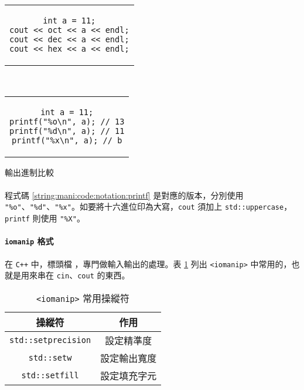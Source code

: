 \documentclass[12pt,a4paper,oneside]{article}
\begin{document}
\begin{CJK}{UTF8}{bkai}
\begin{code}[h!]
  \centering
  \begin{subcode}{.43\textwidth}
    \centering
    \begin{tabular}{c}
    \begin{lstlisting}
int a = 11;
cout << oct << a << endl;
cout << dec << a << endl;
cout << hex << a << endl;
    \end{lstlisting}
    \end{tabular}
    \caption{\lstinline!cout! 版本}
    \label{string:mani:code:notation:cout}
  \end{subcode}
  ~
  \begin{subcode}{.43\textwidth}
    \centering
    \begin{tabular}{c}
    \begin{lstlisting}
int a = 11;
printf("%o\n", a); // 13
printf("%d\n", a); // 11
printf("%x\n", a); // b
    \end{lstlisting}
    \end{tabular}
    \caption{\lstinline!printf! 版本}
    \label{string:mani:code:notation:printf}
  \end{subcode}
  \caption{輸出進制比較}
  \label{string:mani:code:notation}
\end{code}

\paragraph{}程式碼 \ref{string:mani:code:notation:printf} 是對應的版本，分別使用 \lstinline!"%o"!、\lstinline!"%d"!、\lstinline!"%x"!。如要將十六進位印為大寫，\lstinline!cout! 須加上 \lstinline!std::uppercase!，\lstinline!printf! 則使用 \lstinline!"%X"!。
\paragraph{\texttt{iomanip} 格式}在 \texttt{C++} 中，標頭檔 ，專門做輸入輸出的處理。表 \ref{string:mani:table:iomanip} 列出 \lstinline!<iomanip>!
中常用的，也就是用來串在 \lstinline!cin!、\lstinline!cout! 的東西。

\begin{table}[h!]
  \centering
  \begin{tabular}{|c|c|}
  \hline
  \textbf{操縱符} & \textbf{作用}\\
  \hline\hline
  \lstinline!std::setprecision! & 設定精準度\\
  \hline
  \lstinline!std::setw! & 設定輸出寬度\\
  \hline
  \lstinline!std::setfill! & 設定填充字元\\
  \hline
  \end{tabular}
  \caption{\lstinline!<iomanip>! 常用操縱符}
  \label{string:mani:table:iomanip}
\end{table}


\end{CJK}
\end{document}
